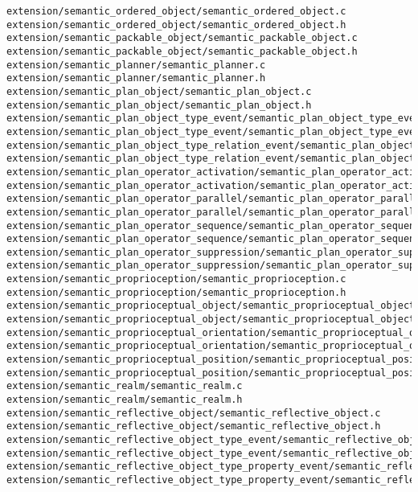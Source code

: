 \begin{lstlisting}
extension/semantic_ordered_object/semantic_ordered_object.c
extension/semantic_ordered_object/semantic_ordered_object.h
extension/semantic_packable_object/semantic_packable_object.c
extension/semantic_packable_object/semantic_packable_object.h
extension/semantic_planner/semantic_planner.c
extension/semantic_planner/semantic_planner.h
extension/semantic_plan_object/semantic_plan_object.c
extension/semantic_plan_object/semantic_plan_object.h
extension/semantic_plan_object_type_event/semantic_plan_object_type_event.c
extension/semantic_plan_object_type_event/semantic_plan_object_type_event.h
extension/semantic_plan_object_type_relation_event/semantic_plan_object_type_relation_event.c
extension/semantic_plan_object_type_relation_event/semantic_plan_object_type_relation_event.h
extension/semantic_plan_operator_activation/semantic_plan_operator_activation.c
extension/semantic_plan_operator_activation/semantic_plan_operator_activation.h
extension/semantic_plan_operator_parallel/semantic_plan_operator_parallel.c
extension/semantic_plan_operator_parallel/semantic_plan_operator_parallel.h
extension/semantic_plan_operator_sequence/semantic_plan_operator_sequence.c
extension/semantic_plan_operator_sequence/semantic_plan_operator_sequence.h
extension/semantic_plan_operator_suppression/semantic_plan_operator_suppression.c
extension/semantic_plan_operator_suppression/semantic_plan_operator_suppression.h
extension/semantic_proprioception/semantic_proprioception.c
extension/semantic_proprioception/semantic_proprioception.h
extension/semantic_proprioceptual_object/semantic_proprioceptual_object.c
extension/semantic_proprioceptual_object/semantic_proprioceptual_object.h
extension/semantic_proprioceptual_orientation/semantic_proprioceptual_orientation.c
extension/semantic_proprioceptual_orientation/semantic_proprioceptual_orientation.h
extension/semantic_proprioceptual_position/semantic_proprioceptual_position.c
extension/semantic_proprioceptual_position/semantic_proprioceptual_position.h
extension/semantic_realm/semantic_realm.c
extension/semantic_realm/semantic_realm.h
extension/semantic_reflective_object/semantic_reflective_object.c
extension/semantic_reflective_object/semantic_reflective_object.h
extension/semantic_reflective_object_type_event/semantic_reflective_object_type_event.c
extension/semantic_reflective_object_type_event/semantic_reflective_object_type_event.h
extension/semantic_reflective_object_type_property_event/semantic_reflective_object_type_property_event.c
extension/semantic_reflective_object_type_property_event/semantic_reflective_object_type_property_event.h

\end{lstlisting}
